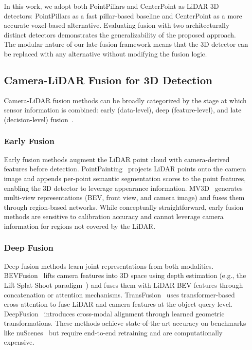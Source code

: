 \documentclass[sustainability,article,submit,moreauthors,pdftex]{Definitions/mdpi}
\begin{document}
In this work, we adopt both PointPillars and CenterPoint as LiDAR 3D detectors: PointPillars as a fast pillar-based baseline and CenterPoint as a more accurate voxel-based alternative. Evaluating fusion with two architecturally distinct detectors demonstrates the generalizability of the proposed approach. The modular nature of our late-fusion framework means that the 3D detector can be replaced with any alternative without modifying the fusion logic.

\subsection{Camera-LiDAR Fusion for 3D Detection}

Camera-LiDAR fusion methods can be broadly categorized by the stage at which sensor information is combined: early (data-level), deep (feature-level), and late (decision-level) fusion~\cite{cui2022deep,wang2023multi}.

\subsubsection{Early Fusion}

Early fusion methods augment the LiDAR point cloud with camera-derived features before detection. PointPainting~\cite{vora2020pointpainting} projects LiDAR points onto the camera image and appends per-point semantic segmentation scores to the point features, enabling the 3D detector to leverage appearance information. MV3D~\cite{chen2017mv3d} generates multi-view representations (BEV, front view, and camera image) and fuses them through region-based networks. While conceptually straightforward, early fusion methods are sensitive to calibration accuracy and cannot leverage camera information for regions not covered by the LiDAR.

\subsubsection{Deep Fusion}

Deep fusion methods learn joint representations from both modalities. BEVFusion~\cite{liu2023bevfusion,liang2022bevfusion} lifts camera features into 3D space using depth estimation (e.g., the Lift-Splat-Shoot paradigm~\cite{philion2020lss}) and fuses them with LiDAR BEV features through concatenation or attention mechanisms. TransFusion~\cite{bai2022transfusion} uses transformer-based cross-attention to fuse LiDAR and camera features at the object query level. DeepFusion~\cite{li2022deepfusion} introduces cross-modal alignment through learned geometric transformations. These methods achieve state-of-the-art accuracy on benchmarks like nuScenes~\cite{caesar2020nuscenes} but require end-to-end retraining and are computationally expensive.
\end{document}
